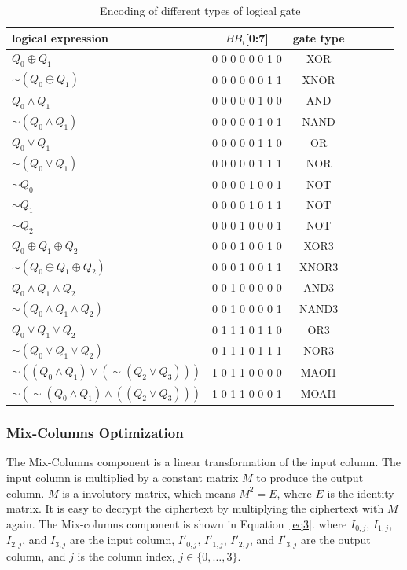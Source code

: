 \documentclass[sn-basic]{sn-jnl}%
\begin{document}
\begin{table}[h]
    \caption{Encoding of different types of logical gate}\label{tab3}%
    \begin{tabular*}{\textwidth}{@{\extracolsep\fill}lcccccc}
        \toprule
        logical expression & $BB_i$[0:7] & gate type \\
        \midrule
        $Q_0 \oplus Q_1$ & 0 0 0 0 0 0 1 0 & XOR \\
        $\sim (Q_0 \oplus Q_1)$ & 0 0 0 0 0 0 1 1 & XNOR \\
        $Q_0 \land Q_1$ & 0 0 0 0 0 1 0 0 & AND \\
        $\sim (Q_0 \land Q_1)$ & 0 0 0 0 0 1 0 1 & NAND \\
        $Q_0 \lor Q_1$ & 0 0 0 0 0 1 1 0 & OR \\
        $\sim (Q_0 \lor Q_1)$ & 0 0 0 0 0 1 1 1 & NOR \\
        $\sim Q_0$ & 0 0 0 0 1 0 0 1 & NOT \\
        $\sim Q_1$ & 0 0 0 0 1 0 1 1 & NOT \\
        $\sim Q_2$ & 0 0 0 1 0 0 0 1 & NOT \\
        $Q_0 \oplus Q_1 \oplus Q_2$ & 0 0 0 1 0 0 1 0 & XOR3 \\
        $\sim (Q_0 \oplus Q_1 \oplus Q_2)$ & 0 0 0 1 0 0 1 1 & XNOR3 \\
        $Q_0 \land Q_1 \land Q_2$ & 0 0 1 0 0 0 0 0 & AND3 \\
        $\sim (Q_0 \land Q_1 \land Q_2)$ & 0 0 1 0 0 0 0 1 & NAND3 \\
        $Q_0 \lor Q_1 \lor Q_2$ & 0 1 1 1 0 1 1 0 & OR3 \\
        $\sim (Q_0 \lor Q_1 \lor Q_2)$ & 0 1 1 1 0 1 1 1 & NOR3 \\
        $\sim ((Q_0 \land Q_1) \lor (\sim (Q_2 \lor Q_3)))$ & 1 0 1 1 0 0 0 0 & MAOI1 \\
        $\sim (\sim (Q_0 \land Q_1) \land ((Q_2 \lor Q_3)))$ & 1 0 1 1 0 0 0 1 & MOAI1 \\
        \bottomrule
    \end{tabular*}
\end{table}

\subsubsection{Mix-Columns Optimization}\label{subsubsec2}

The Mix-Columns component is a linear transformation of the input column.
The input column is multiplied by a constant matrix $M$ to produce the output column.
$M$ is a involutory matrix, which means $M^2 = E$, where $E$ is the identity matrix.
It is easy to decrypt the ciphertext by multiplying the ciphertext with $M$ again.
The Mix-columns component is shown in Equation~\ref{eq3}.
where $I_{0,j}$, $I_{1,j}$, $I_{2,j}$, and $I_{3,j}$ are the input column, $I'_{0,j}$, $I'_{1,j}$, $I'_{2,j}$, and $I'_{3,j}$ are the output column, and $j$ is the column index, $j \in \{0,\dots,3\}$.
\end{document}
